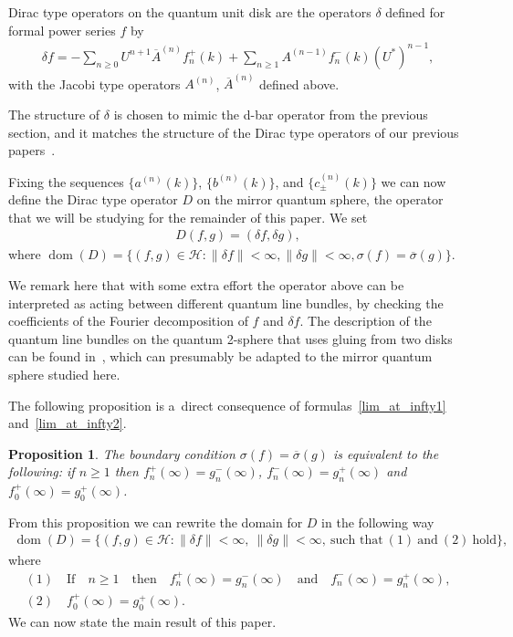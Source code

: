 \documentclass[pdftex]{sigma}
\numberwithin{equation}{section}
\newtheorem{prop}[theo]{Proposition}
{\theoremstyle{definition}
\newtheorem{rem}[theo]{Remark}
\newtheorem{defin}[theo]{Definition}
}
\DeclareMathOperator{\dom}{dom}
\begin{document}
\begin{defin}
Dirac type operators on the quantum unit disk are the operators $\delta$ def\/ined for formal power series $f$ by
\begin{gather}
\label{quantDTO}
\delta f = -\sum\limits_{n\ge0} U^{n+1} \overline{A}^{(n)}f_n^+(k) + \sum\limits_{n\ge1} A^{(n-1)}f_n^-(k)(U^*)^{n-1},
\end{gather}
with the Jacobi type operators $A^{(n)}$, $\overline {A}^{(n)}$ def\/ined above.
\end{defin}

The structure of $\delta$ is chosen to mimic the d-bar operator from the previous section, and it matches the structure
of the Dirac type operators of our previous papers~\cite{CKW,KM1,KM2,KM4,KM5}.

Fixing the sequences $\{a^{(n)}(k)\}$, $\{b^{(n)}(k)\}$, and $\{c_{\pm}^{(n)}(k)\}$ we can now def\/ine the Dirac type
operator $D$ on the mirror quantum sphere, the operator that we will be studying for the remainder of this paper.
We set
\begin{gather}
\label{quant_dirac_op}
D(f,g) = (\delta f, \delta g),
\end{gather}
where $\dom(D) = \{ (f,g)\in\mathcal{H}: \|\delta f\|<\infty, \|\delta g\|<\infty,\sigma(f) =
\overline{\sigma}(g)\}$.

We remark here that with some extra ef\/fort the operator above can be interpreted as acting between dif\/ferent quantum
line bundles, by checking the coef\/f\/icients of the Fourier decomposition of $f$ and $\delta f$.
The description of the quantum line bundles on the quantum 2-sphere that uses gluing from two disks can be found
in~\cite{Wagner}, which can presumably be adapted to the mirror quantum sphere studied here.

The following proposition is a~direct consequence of formulas~\eqref{lim_at_infty1} and~\eqref{lim_at_infty2}.

\begin{prop}
\label{bndy_cond_quant}
The boundary condition $ \sigma(f) = \overline{\sigma}(g)$ is equivalent to the following: if $n\ge 1$ then
$f_n^+(\infty) = g_n^-(\infty)$,
$f_n^-(\infty) = g_n^+(\infty)$ and $f_0^+(\infty) = g_0^+(\infty)$.
\end{prop}

From this proposition we can rewrite the domain for $D$ in the following way
\begin{gather*}
\dom(D) = \{(f,g)\in\mathcal{H}: \|\delta f\|<\infty,~\|\delta g\|<\infty,~\text{such that}~(1)~\text{and}~(2)~\text{hold}\},
\end{gather*}
where
\begin{gather*}
(1)\quad\text{If}\quad n\ge 1 \quad\text{then}\quad  f_n^+(\infty) = g_n^-(\infty)\quad\text{and}\quad  f_n^-(\infty) = g_n^+(\infty),
\\
(2)\quad f_0^+(\infty) = g_0^+(\infty).
\end{gather*}
We can now state the main result of this paper.
\end{document}

